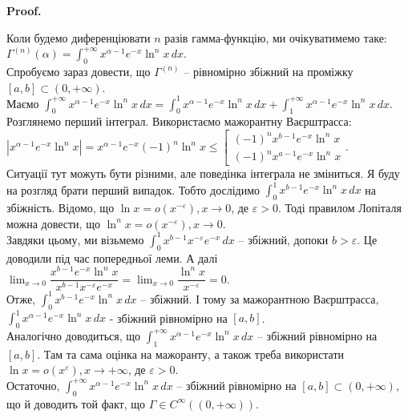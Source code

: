 \documentclass[a4paper, 10pt]{article}
\makeatletter
\def\huge{\displaystyle}
\theoremstyle{theoremdd}
\theoremstyle{theoremdd}
\theoremstyle{theoremdd}
\theoremstyle{theoremdd}
\theoremstyle{theoremdd}
\theoremstyle{theoremdd}
\theoremstyle{theoremdd}
\theoremstyle{theoremdd}
\theoremstyle{theoremdd}
\renewenvironment{proof}[1][Proof.\\]{\par
\pushQED{\hfill \qed}%
\normalfont \topsep6\p@\@plus6\p@\relax
\trivlist
\item\relax
{\bfseries
#1\@addpunct{.}}\hspace\labelsep\ignorespaces
}{%
\popQED\endtrivlist\@endpefalse
}
\makeatother
\begin{document}
\begin{proof}
Коли будемо диференціювати $n$ разів гамма-функцію, ми очікуватимемо таке:\\
$\Gamma^{(n)}(\alpha) = \huge\int_0^{+\infty} x^{\alpha-1}e^{-x} \ln^n x\,dx$.\\
Спробуємо зараз довести, що $\Gamma^{(n)}$ -- рівномірно збіжний на проміжку $[a,b] \subset (0,+\infty)$.\\
Маємо $\huge\int_0^{+\infty} x^{\alpha-1}e^{-x} \ln^n x\,dx = \huge\int_0^{1} x^{\alpha-1}e^{-x} \ln^n x\,dx + \huge\int_1^{+\infty} x^{\alpha-1}e^{-x} \ln^n x\,dx$.\\
Розглянемо перший інтеграл. Використаємо мажорантну Ваєрштрасса:\\
$|x^{\alpha-1}e^{-x} \ln^n x| = x^{\alpha-1}e^{-x} (-1)^n \ln^n x \leq \left[ \begin{gathered} (-1)^n x^{b-1}e^{-x}\ln^n x \\ (-1)^n x^{a-1}e^{-x}\ln^n x \end{gathered} \right.$.\\
Ситуації тут можуть бути різними, але поведінка інтеграла не зміниться. Я буду на розгляд брати перший випадок. Тобто дослідимо $\huge\int_0^{1} x^{b-1}e^{-x}\ln^n x\,dx$ на збіжність. Відомо, що $\ln x = o(x^{-\varepsilon}), x \to 0$, де $\varepsilon > 0$. Тоді правилом Лопіталя можна довести, що $\ln^n x = o(x^{-\varepsilon}), x \to 0$.\\
Завдяки цьому, ми візьмемо $\huge\int_0^1 x^{b-1} x^{-\varepsilon} e^{-x}\,dx$ -- збіжний, допоки $b > \varepsilon$. Це доводили під час попередньої леми. А далі $\huge\lim_{x \to 0} \dfrac{x^{b-1}e^{-x} \ln^n x}{x^{b-1} x^{-\varepsilon} e^{-x}} = \lim_{x \to 0} \dfrac{\ln^n x}{x^{-\varepsilon}} = 0$.\\
Отже, $\huge\int_0^{1} x^{b-1}e^{-x} \ln^n x\,dx$ -- збіжний. І тому за мажорантною Ваєрштрасса, $\huge\int_0^1 x^{\alpha-1}e^{-x} \ln^n x\,dx$ - збіжний рівномірно на $[a,b]$.
\\
Аналогічно доводиться, що $\huge\int_1^{+\infty} x^{\alpha-1} e^{-x}\ln^n x\,dx$ -- збіжний рівномірно на $[a,b]$. Там та сама оцінка на мажоранту, а також треба використати $\ln x = o(x^{\varepsilon}), x \to +\infty$, де $\varepsilon >0$.\\ 
Остаточно, $\huge\int_0^{+\infty} x^{\alpha-1}e^{-x} \ln^n x\,dx$ -- збіжний рівномірно на $[a,b] \subset (0,+\infty)$, що й доводить той факт, що $\Gamma \in C^{\infty}((0,+\infty))$.
\end{proof}
\end{document}

